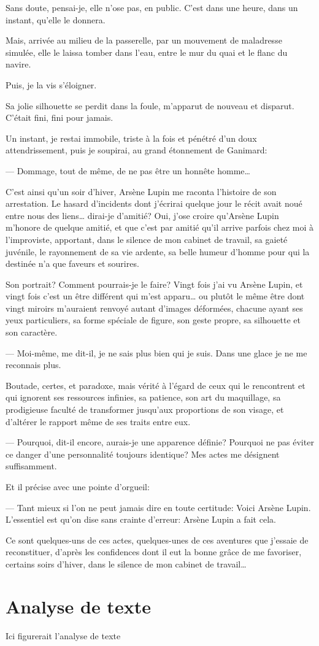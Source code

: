 \documentclass[12pt,a4paper]{book}
\begin{document}
Sans doute, pensai-je, elle n’ose pas, en public. C’est dans une heure, dans un instant, qu’elle le donnera.

Mais, arrivée au milieu de la passerelle, par un mouvement de maladresse simulée, elle le laissa tomber dans l’eau, entre le mur du quai et le flanc du navire.

Puis, je la vis s’éloigner.

Sa jolie silhouette se perdit dans la foule, m’apparut de nouveau et disparut. C’était fini, fini pour jamais.

Un instant, je restai immobile, triste à la fois et pénétré d’un doux attendrissement, puis je soupirai, au grand étonnement de Ganimard:

— Dommage, tout de même, de ne pas être un honnête homme… 

C’est ainsi qu’un soir d’hiver, Arsène Lupin me raconta l’histoire de son arrestation. Le hasard d’incidents dont j’écrirai quelque jour le récit avait noué entre nous des liens… dirai-je d’amitié? Oui, j’ose croire qu’Arsène Lupin m’honore de quelque amitié, et que c’est par amitié qu’il arrive parfois chez moi à l’improviste, apportant, dans le silence de mon cabinet de travail, sa gaieté juvénile, le rayonnement de sa vie ardente, sa belle humeur d’homme pour qui la destinée n’a que faveurs et sourires.

Son portrait? Comment pourrais-je le faire? Vingt fois j’ai vu Arsène Lupin, et vingt fois c’est un être différent qui m’est apparu… ou plutôt le même être dont vingt miroirs m’auraient renvoyé autant d’images déformées, chacune ayant ses yeux particuliers, sa forme spéciale de figure, son geste propre, sa silhouette et son caractère.

— Moi-même, me dit-il, je ne sais plus bien qui je suis. Dans une glace je ne me reconnais plus.

Boutade, certes, et paradoxe, mais vérité à l’égard de ceux qui le rencontrent et qui ignorent ses ressources infinies, sa patience, son art du maquillage, sa prodigieuse faculté de transformer jusqu’aux proportions de son visage, et d’altérer le rapport même de ses traits entre eux. 

— Pourquoi, dit-il encore, aurais-je une apparence définie? Pourquoi ne pas éviter ce danger d’une personnalité toujours identique? Mes actes me désignent suffisamment.

Et il précise avec une pointe d’orgueil:

— Tant mieux si l’on ne peut jamais dire en toute certitude: Voici Arsène Lupin. L’essentiel est qu’on dise sans crainte d’erreur: Arsène Lupin a fait cela.



Ce sont quelques-uns de ces actes, quelques-unes de ces aventures que j’essaie de reconstituer, d’après les confidences dont il eut la bonne grâce de me favoriser, certains soirs d’hiver, dans le silence de mon cabinet de travail…

\appendix
	\chapter{Analyse de texte}
	
	Ici figurerait l'analyse de texte
	
\backmatter
	\tableofcontents
\end{document}
